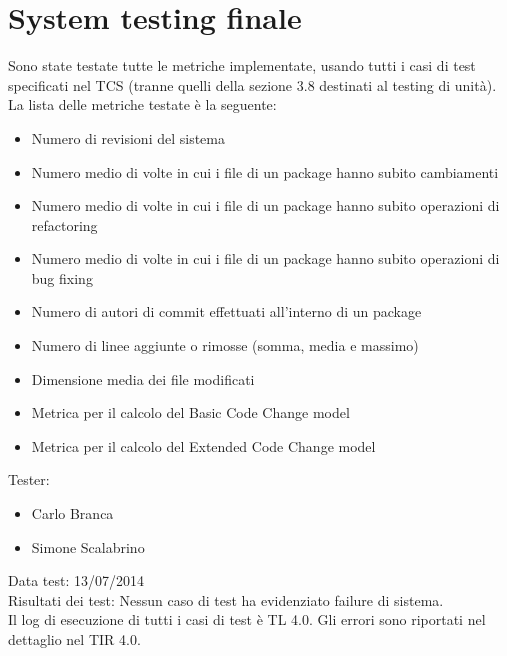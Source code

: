 \section{System testing finale}
Sono state testate tutte le metriche implementate, usando tutti i casi di test specificati nel TCS (tranne quelli della sezione 3.8 destinati al testing di unità). La lista delle metriche testate è la seguente:
\begin{itemize}
 \item Numero di revisioni del sistema
 \item Numero medio di volte in cui i file di un package hanno subito cambiamenti
 \item Numero medio di volte in cui i file di un package hanno subito operazioni di refactoring
 \item Numero medio di volte in cui i file di un package hanno subito operazioni di bug fixing
 \item Numero di autori di commit effettuati all’interno di un package
 \item Numero di linee aggiunte o rimosse (somma, media e massimo)
 \item Dimensione media dei file modificati
 \item Metrica per il calcolo del Basic Code Change model
 \item Metrica per il calcolo del Extended Code Change model
\end{itemize}
Tester:
\begin{itemize}
\item Carlo Branca
\item Simone Scalabrino
\end{itemize}
Data test: 13/07/2014\\
Risultati dei test: Nessun caso di test ha evidenziato failure di sistema.\\
Il log di esecuzione di tutti i casi di test è TL 4.0. Gli errori sono riportati nel dettaglio nel TIR 4.0.
